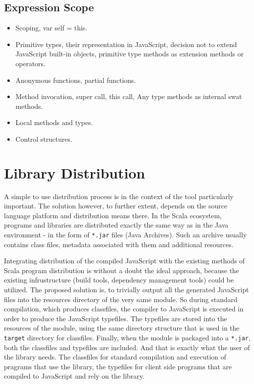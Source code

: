 \documentclass[12pt,a4paper]{report}
\begin{document}
\subsection{Expression Scope}

\begin{itemize}
\item Scoping, var self = this.
\item Primitive types, their representation in JavaScript, decision not to extend JavaScript built-in objects, primitive type methods as extension methods or operators.
\item Anonymous functions, partial functions.
\item Method invocation, super call, this call, Any type methods as internal swat methods.
\item Local methods and types.
\item Control structures.
\end{itemize}

\section{Library Distribution}

A simple to use distribution process is in the context of the tool particularly important. The solution however, to further extent, depends on the source language platform and distribution means there. In the Scala ecosystem, programs and libraries are distributed exactly the same way as in the Java environment - in the form of \texttt{*.jar} files (Java Archives). Such an archive usually contains class files, metadata associated with them and additional resources.

Integrating distribution of the compiled JavaScript with the existing methods of Scala program distribution is without a doubt the ideal approach, because the existing infrustructure (build tools, dependency management tools) could be utilized. The proposed solution is, to trivially output all the generated JavaScript files into the resources directory of the very same module. So during standard compilation, which produces classfiles, the compiler to JavaScript is executed in order to produce the JavaScript typefiles. The typefiles are stored into the resources of the module, using the same directory structure that is used in the \texttt{target} directory for classfiles. Finally, when the module is packaged into a \texttt{*.jar}, both the classfiles and typefiles are included. And that is exactly what the user of the library needs. The classfiles for standard compilation and execution of pragrams that use the library, the typefiles for client side programs that are compiled to JavaScript and rely on the library.
\end{document}
